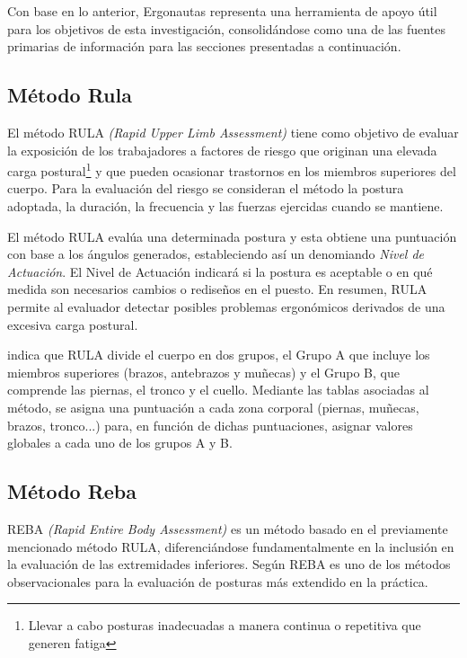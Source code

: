 Con base en lo anterior, Ergonautas representa una herramienta de apoyo útil para los objetivos de esta investigación, consolidándose como una de las fuentes primarias de información para las secciones presentadas a continuación.

\subsection{Método Rula}
El método RULA \textit{(Rapid Upper Limb Assessment)} tiene como objetivo de evaluar la exposición de los trabajadores a factores de riesgo que originan una elevada carga postural\footnote{Llevar a cabo posturas inadecuadas a manera continua o repetitiva que generen fatiga} y que pueden ocasionar trastornos en los miembros superiores del cuerpo. Para la evaluación del riesgo se consideran el método la postura adoptada, la duración, la frecuencia y las fuerzas ejercidas cuando se mantiene.\parencite[2]{Mcatamney1993RULA:Disorders}

El método RULA evalúa una determinada postura y esta obtiene una puntuación con base a los ángulos generados, estableciendo así un denomiando \textit{Nivel de Actuación}. El Nivel de Actuación indicará si la postura es aceptable o en qué medida son necesarios cambios o rediseños en el puesto. En resumen, RULA permite al evaluador detectar posibles problemas ergonómicos derivados de una excesiva carga postural.\parencite{Diego-Mas2015EvaluacionRULA}\parencite[4]{Mcatamney1993RULA:Disorders}

\parencite{Diego-Mas2015EvaluacionRULA} indica que RULA divide el cuerpo en dos grupos, el Grupo A que incluye los miembros superiores (brazos, antebrazos y muñecas) y el Grupo B, que comprende las piernas, el tronco y el cuello. Mediante las tablas asociadas al método, se asigna una puntuación a cada zona corporal (piernas, muñecas, brazos, tronco...) para, en función de dichas puntuaciones, asignar valores globales a cada uno de los grupos A y B.
\subsection{Método Reba}
REBA \textit{(Rapid Entire Body Assessment)} es un método basado en el previamente mencionado método RULA, diferenciándose fundamentalmente en la inclusión en la evaluación de las extremidades inferiores. Según \parencite{Diego-Mas2015EvaluacionREBA} REBA es uno de los métodos observacionales para la evaluación de posturas más extendido en la práctica.

